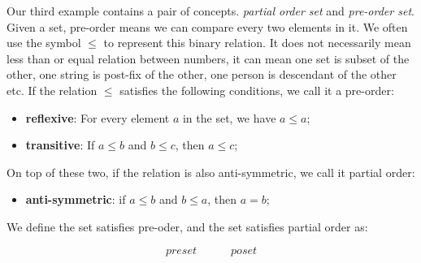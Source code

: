 \documentclass{article}
\begin{document}
 
 
Our third example contains a pair of concepts. {\em partial order set} and {\em pre-order set}. Given a set, pre-order means we can compare every two elements in it. We often use the symbol $\leq$ to represent this binary relation. It does not necessarily mean less than or equal relation between numbers, it can mean one set is subset of the other, one string is post-fix of the other, one person is descendant of the other etc. If the relation $\leq$ satisfies the following conditions, we call it a pre-order:

\begin{itemize}
\item \textbf{reflexive}: For every element $a$ in the set, we have $a \leq a$;
\item \textbf{transitive}: If $a \leq b$ and $b \leq c$, then $a \leq c$;
\end{itemize}

On top of these two, if the relation is also anti-symmetric, we call it partial order:

\begin{itemize}
\item \textbf{anti-symmetric}: if $a \leq b$ and $b \leq a$, then $a = b$;
\end{itemize}

We define the set satisfies pre-oder, and the set satisfies partial order as:

\[
preset \quad \quad \quad poset
\]
\end{document}
